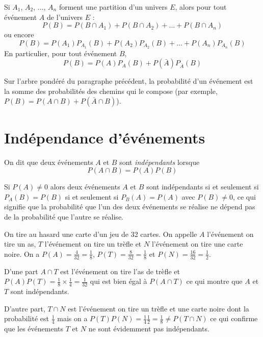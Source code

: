 \documentclass[french]{book}
\begin{document}
\begin{thm}
 Si $A_1$, $A_2$, ..., $A_n$ forment une partition d'un univers $E$, alors pour tout événement $A$ de l'univers $E$ :
$$P(B)=P(B\cap A_1)+P(B\cap A_2)+...+P(B\cap A_n)$$
ou encore
$$P(B)=P(A_1)P_{A_1}(B)+P(A_2)P_{A_2}(B)+...+P(A_n)P_{A_n}(B)$$
En particulier, pour tout événement $B$,
$$P(B)=P(A)P_{A}(B)+P(\bar{A})P_{\bar{A}}(B)$$
\end{thm}

\begin{defn}
Sur l'arbre pondéré du paragraphe précédent, la probabilité d'un événement est la somme des probabilités des chemins qui le compose (par exemple, $P(B)=P(A\cap B)+P(\bar{A}\cap B)$).
\end{defn}



\section{Indépendance d'événements}

\begin{defn}
On dit que deux événements $A$ et $B$ sont \emph{indépendants} lorsque $$P(A\cap B)=P(A)P(B)$$
\end{defn}
\begin{rem}
Si $P(A)\neq 0$ alors deux événements $A$ et $B$ sont indépendants si et seulement si $P_A(B)=P(B)$ si et seulement si $P_B(A)=P(A)$ avec $P(B)\neq 0$, ce qui signifie que la probabilité que l'un des deux événements se réalise ne dépend pas de la probabilité que l'autre se réalise.
\end{rem} 

\begin{exemple}
On tire au hasard une carte d'un jeu de 32 cartes. On appelle $A$ l'événement \og{}on tire un as\fg{}, $T$ l'événement \og{}on tire un  trèfle\fg{} et $N$ l'événement \og{}on tire une carte noire\fg{}. On a $P(A)=\frac{4}{32}=\frac{1}{8}$, $P(T)=\frac{8}{32}=\frac{1}{8}$ et $P(N)=\frac{16}{32}=\frac{1}{2}$.

 D'une part $A\cap T$ est l'événement \og{}on tire l'as de trèfle\fg{} et $P(A)P(T)=\frac{1}{8}\times \frac{1}{4}=\frac{1}{32}$ qui est bien égal à $P(A\cap T)$ ce qui montre que $A$ et $T$ sont indépendants. 
 
 D'autre part, $T\cap N$ est l'événement \og{}on tire un trèfle et une carte noire\fg{} dont la probabilité est $\frac{1}{4}$ mais on a $P(T)P(N)=\frac{1}{4}\frac{1}{2}=\frac{1}{8}\neq P(T\cap N)$ ce qui confirme que les événements $T$ et $N$ ne sont évidemment pas indépendants.
 
\end{exemple}
\end{document}
